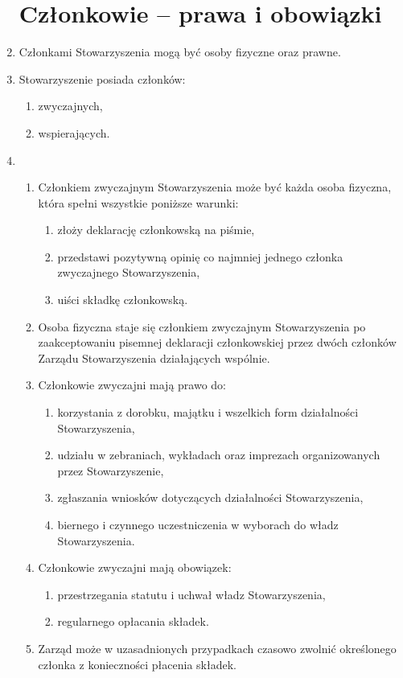 \documentclass[chapterprefix,notitlepage]{article}
\begin{document}
\begin{enumerate}
	
\section{Członkowie -- prawa i obowiązki}	
	
	\item Członkami Stowarzyszenia mogą być osoby fizyczne oraz prawne.
	
	\item Stowarzyszenie posiada członków:
	\begin{enumerate}[1)]
		\item zwyczajnych,
		\item wspierających.
	\end{enumerate}

	\item \begin{enumerate}
		\item Członkiem zwyczajnym Stowarzyszenia może być każda osoba fizyczna, która spełni wszystkie poniższe warunki:
		\begin{enumerate}
			\item złoży deklarację członkowską na piśmie,
			\item przedstawi pozytywną opinię co najmniej jednego członka zwyczajnego Stowarzyszenia,
			\item uiści składkę członkowską.
		\end{enumerate}
		\item Osoba fizyczna staje się członkiem zwyczajnym Stowarzyszenia po zaakceptowaniu pisemnej deklaracji członkowskiej przez dwóch członków Zarządu Stowarzyszenia działających wspólnie.
		\item Członkowie zwyczajni mają prawo do:
		\begin{enumerate}
			\item korzystania z dorobku, majątku i wszelkich form działalności Stowarzyszenia,
			\item udziału w zebraniach, wykładach oraz imprezach organizowanych przez Stowarzyszenie,
			\item zgłaszania wniosków dotyczących działalności Stowarzyszenia,
			\item biernego i czynnego uczestniczenia w wyborach do władz Stowarzyszenia.
		\end{enumerate}
		\item Członkowie zwyczajni mają obowiązek:
		\begin{enumerate}
			\item przestrzegania statutu i uchwał władz Stowarzyszenia,
			\item regularnego opłacania składek.
		\end{enumerate}
		\item Zarząd może w uzasadnionych przypadkach czasowo zwolnić określonego członka z konieczności płacenia składek.
	\end{enumerate}


\end{enumerate}
\end{document}
